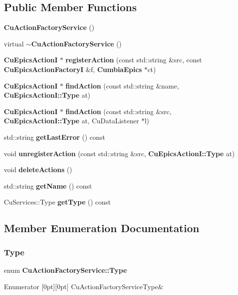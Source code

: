 \subsection*{Public Member Functions}
\begin{DoxyCompactItemize}
\item 
\textbf{ Cu\+Action\+Factory\+Service} ()
\item 
virtual \textbf{ $\sim$\+Cu\+Action\+Factory\+Service} ()
\item 
\textbf{ Cu\+Epics\+ActionI} $\ast$ \textbf{ register\+Action} (const std\+::string \&src, const \textbf{ Cu\+Epics\+Action\+FactoryI} \&f, \textbf{ Cumbia\+Epics} $\ast$ct)
\item 
\textbf{ Cu\+Epics\+ActionI} $\ast$ \textbf{ find\+Action} (const std\+::string \&name, \textbf{ Cu\+Epics\+Action\+I\+::\+Type} at)
\item 
\textbf{ Cu\+Epics\+ActionI} $\ast$ \textbf{ find\+Action} (const std\+::string \&src, \textbf{ Cu\+Epics\+Action\+I\+::\+Type} at, Cu\+Data\+Listener $\ast$l)
\item 
std\+::string \textbf{ get\+Last\+Error} () const
\item 
void \textbf{ unregister\+Action} (const std\+::string \&src, \textbf{ Cu\+Epics\+Action\+I\+::\+Type} at)
\item 
void \textbf{ delete\+Actions} ()
\item 
std\+::string \textbf{ get\+Name} () const
\item 
Cu\+Services\+::\+Type \textbf{ get\+Type} () const
\end{DoxyCompactItemize}


\subsection{Member Enumeration Documentation}
\mbox{\label{classCuActionFactoryService_ad2bb6770622dc3dc24a5846f818e8bdc}} 
\subsubsection{Type}
{\footnotesize\ttfamily enum \textbf{ Cu\+Action\+Factory\+Service\+::\+Type}}

\begin{DoxyEnumFields}{Enumerator}
[0pt][0pt]{}\mbox{\label{classCuActionFactoryService_ad2bb6770622dc3dc24a5846f818e8bdcafb23f61f823444e6df483206eb9b7e11}} 
Cu\+Action\+Factory\+Service\+Type&\\
\hline

\end{DoxyEnumFields}


